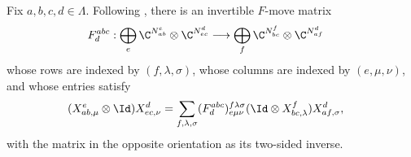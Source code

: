 \begin{lemma}%
    \label{thm:mpdo_complete_zipper_printed_fmove}
    \leanok
    Fix $a,b,c,d\in\Lambda$. Following \cite[Section~3.4]{Bultinck2017Anyons},
    there is an invertible $F$-move matrix
    \begin{align}
        F^{abc}_d:
        \bigoplus_e\C^{N_{ab}^{e}}\otimes\C^{N_{ec}^{d}}
         & \longrightarrow
        \bigoplus_f\C^{N_{bc}^{f}}\otimes\C^{N_{af}^{d}} \notag
    \end{align}
    whose rows are indexed by $(f,\lambda,\sigma)$, whose columns are
    indexed by $(e,\mu,\nu)$, and whose entries satisfy
    \begin{align}
        (X^e_{ab,\mu}\otimes\Id)X^d_{ec,\nu}
         & =
        \sum_{f,\lambda,\sigma}
        (F^{abc}_d)^{f\lambda\sigma}_{e\mu\nu}
        (\Id\otimes X^f_{bc,\lambda})X^d_{af,\sigma},
        \label{eq:rfp_printed_fmove}
    \end{align}
    with the matrix in the opposite orientation as its two-sided inverse.
\end{lemma}
